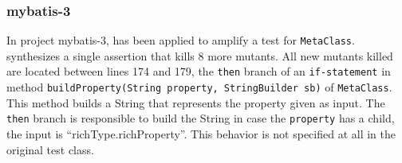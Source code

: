 \subsubsection{mybatis-3}


In project mybatis-3, \dspot has been applied to amplify a test for \texttt{MetaClass}. 
\dspot synthesizes a single assertion that kills 8 more mutants.
All new mutants killed are located between lines 174 and 179, \ie the \texttt{then} branch of an \texttt{if-statement} in method \texttt{buildProperty(String property, StringBuilder sb)} of \texttt{MetaClass}.
This method builds a String that represents the  property given as input. 
The \texttt{then} branch is responsible to build  the String in case the \texttt{property} has a child, \eg the input is ``richType.richProperty''. 
This behavior is not specified at all in the original test class.

